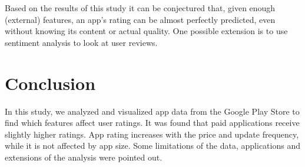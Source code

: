 \documentclass{article}
\begin{document}
Based on the results of this study it can be conjectured that, given enough (external) features, an app's rating can be almost perfectly predicted, even without knowing its content or actual quality. One possible extension is to use sentiment analysis to look at user reviews.

\section{Conclusion}

In this study, we analyzed and visualized app data from the Google Play Store to find which features affect user ratings. It was found that paid applications receive slightly higher ratings. App rating increases with the price and update frequency, while it is not affected by app size. Some limitations of the data, applications and extensions of the analysis were pointed out.

\appendix
\printbibliography
\end{document}
